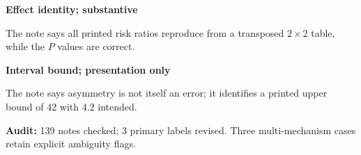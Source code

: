 \textbf{Effect identity; substantive}\par
{}\par
The note says all printed risk ratios reproduce from a transposed $2\times2$ table, while the $P$ values are correct.\par\medskip
\textbf{Interval bound; presentation only}\par
{}\par
The note says asymmetry is not itself an error; it identifies a printed upper bound of 42 with 4.2 intended.\par\medskip
\textbf{Audit:} 139 notes checked; 3 primary labels revised. Three multi-mechanism cases retain explicit ambiguity flags.
